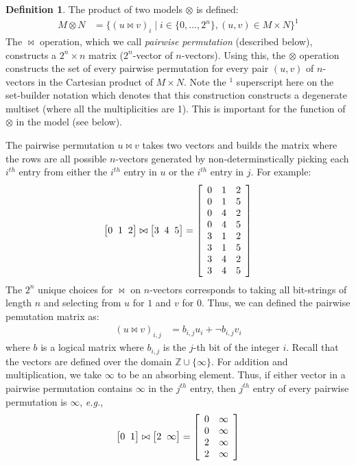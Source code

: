 \documentclass[9pt]{sigplanconf}
\newcounter{block}
\theoremstyle{definition}
\newtheorem{definition}[block]{Definition}
\newcommand{\eg}{\emph{e.g.}}
\newcommand{\vtwoh}[2]{\setlength{\arraycolsep}{0em}
\left[\begin{array}{cc}#1 \; & \; #2\end{array}\right]}
\newcommand{\vthreeh}[3]{\setlength{\arraycolsep}{0em}
\left[\begin{array}{ccc}#1 \; & \; #2 \; & \; #3\end{array}\right]}
\begin{document}
\begin{definition}The product of two models $\otimes$ is defined:
\begin{align*}
M \otimes N & =
  \{(u \bowtie v)_i \mid i \in \{0, \ldots, 2^n \}, (u, v) \in
              M \times N\}^1
\end{align*}
The $\bowtie$ operation, which we call \emph{pairwise permutation}
(described below), constructs a $2^n \times n$ matrix ($2^n$-vector of
$n$-vectors).  Using this, the $\otimes$ operation constructs the set
of every pairwise permutation for every pair $(u, v)$ of $n$-vectors in the
Cartesian product of $M \times N$. Note the $^1$ superscript here 
on the set-builder notation which denotes that this construction
constructs a degenerate multiset (where all the multiplicities are 1).
This is important for the function of $\otimes$ in the model (see below).

The pairwise permutation $u \bowtie v$ takes two vectors and builds the matrix
where the rows are all possible $n$-vectors generated by 
non-determinstically picking each $i^{th}$ entry from either the
$i^{th}$ entry in $u$ or the $i^{th}$ entry in $j$. For example:  
%
\begin{equation*}
\vthreeh{0}{1}{2} \bowtie \vthreeh{3}{4}{5} = 
\setlength{\arraycolsep}{0.5em}
\left[\begin{array}{ccc}
0 & 1 & 2 \\
0 & 1 & 5 \\
0 & 4 & 2 \\
0 & 4 & 5 \\
3 & 1 & 2 \\
3 & 1 & 5 \\
3 & 4 & 2 \\
3 & 4 & 5 
\end{array}
\right]
\end{equation*}
%
The $2^n$ unique choices for $\bowtie$ on $n$-vectors 
corresponds to taking all bit-strings of length $n$ and
selecting from $u$ for $1$ and $v$ for $0$. Thus, we can
defined the pairwise pemutation matrix as:
%
\begin{align*}
(u \bowtie v)_{i,j} & = b_{i,j} u_i + \neg b_{i,j} v_i
\end{align*}
%
where $b$ is a logical matrix where $b_{i,j}$ is the $j$-th bit of the integer $i$. 
Recall that the vectors are defined over the domain
$\mathbb{Z} \cup \{\infty\}$. 
For addition and multiplication, we take 
 $\infty$ to be an absorbing element. Thus, if either
vector in a pairwise permutation contains $\infty$ in
the $j^{th}$ entry, then $j^{th}$ entry of every pairwise
permutation is $\infty$, \eg{}, 
\begin{equation*}
\vtwoh{0}{1} \bowtie \vtwoh{2}{\infty} = 
\setlength{\arraycolsep}{0.5em}
\left[\begin{array}{cc}
0 & \infty \\
0 & \infty \\ 
2 & \infty \\
2 & \infty
\end{array}
\right]
\end{equation*}


\end{definition}
\end{document}
